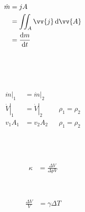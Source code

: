 \begin{boxleft}
\\
\end{boxleft}\begin{boxrightshaded}
\begin{align*}
\dot{m}&=jA\\
&=\iint_A \vv{j} \diff\vv{A}\\
&=\frac{\diff m}{\diff t}
\end{align*}
\end{boxrightshaded}

\begin{boxleft}
\\
\\
\\
\end{boxleft}\begin{boxrightshaded}
\begin{align*}
\left.\dot{m}\right|_1&=\left.\dot{m}\right|_2\\
\left.\dot{V}\right|_1&=\left.\dot{V}\right|_2&&\rho_1=\rho_2\\
v_1A_1&=v_2A_2&&\rho_1=\rho_2
\end{align*}
\end{boxrightshaded}

\begin{boxleft}
\\
\\
\end{boxleft}\begin{boxrightshaded}
\begin{align*}
\kappa&=\frac{\Delta V}{\Delta p V}
\end{align*}
\end{boxrightshaded}

\begin{boxleft}
\\
\end{boxleft}\begin{boxrightshaded}
\begin{align*}
\frac{\Delta V}{V}&= \gamma \Delta T
\end{align*}
\end{boxrightshaded}

